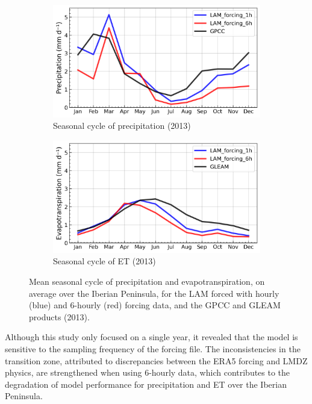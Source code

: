 \begin{figure}[htbp]
    \centering
    \begin{subfigure}[b]{0.49\textwidth}
        \caption{Seasonal cycle of precipitation (2013)}
        \includegraphics[width=\textwidth]{images/chap4/forcing_sampling_freq/IP_seasonal_cycle_precip.png}
    \end{subfigure}
    \begin{subfigure}[b]{0.49\textwidth}
        \caption{Seasonal cycle of ET (2013)}
        \includegraphics[width=\textwidth]{images/chap4/forcing_sampling_freq/IP_seasonal_cycle_evap.png}
    \end{subfigure}
    \caption{Mean seasonal cycle of precipitation and evapotranspiration, on average over the Iberian Peninsula, for the LAM forced with hourly (blue) and 6-hourly (red) forcing data, and the GPCC and GLEAM products (2013).}
    \label{fig:forcing_sampling_freq_SC}
\end{figure}

Although this study only focused on a single year, it revealed that the model is sensitive to the sampling frequency of the forcing file. The inconsistencies in the transition zone, attributed to discrepancies between the ERA5 forcing and LMDZ physics, are strengthened when using 6-hourly data, which contributes to the degradation of model performance for precipitation and ET over the Iberian Peninsula.

